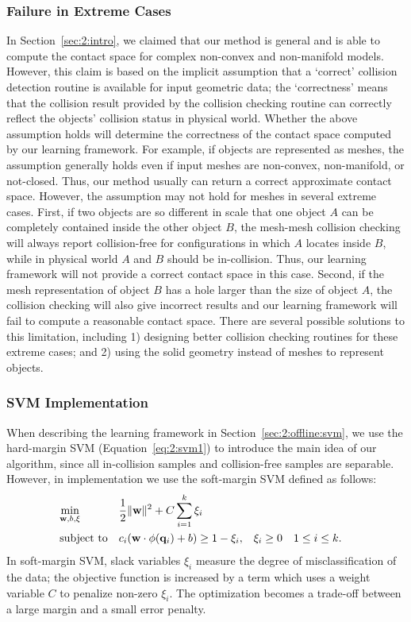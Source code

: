 \subsubsection{Failure in Extreme Cases}
In Section~\ref{sec:2:intro}, we claimed that our method is general and is able to compute the contact space for complex non-convex and non-manifold models. However, this claim is based on the implicit assumption that a `correct' collision detection routine is available for input geometric data; the `correctness' means that the collision result provided by the collision checking routine can correctly reflect the objects' collision status in physical world. Whether the above assumption holds will determine the correctness of the contact space computed by our learning framework. For example, if objects are represented as meshes, the assumption generally holds even if input meshes are non-convex, non-manifold, or not-closed. Thus, our method usually can return a correct approximate contact space. However, the assumption may not hold for meshes in several extreme cases. First, if two objects are so different in scale that one object $A$ can be completely contained inside the other object $B$, the mesh-mesh collision checking will always report collision-free for configurations in which $A$ locates inside $B$, while in physical world $A$ and $B$ should be in-collision. Thus, our learning framework will not provide a correct contact space in this case. Second, if the mesh representation of object $B$ has a hole larger than the size of object $A$, the collision checking will also give incorrect results and our learning framework will fail to compute a reasonable contact space. There are several possible solutions to this limitation, including 1) designing better collision checking routines for these extreme cases; and 2) using the solid geometry instead of meshes to represent objects.

\subsubsection{SVM Implementation}
When describing the learning framework in Section~\ref{sec:2:offline:svm}, we use the hard-margin SVM (Equation~\ref{eq:2:svm1}) to introduce the main idea of our algorithm, since all in-collision samples and collision-free samples are separable. However, in implementation we use the soft-margin SVM defined as follows:
\begin{align}
\label{eq:2:svmsoft}
& \underset{\mathbf w, b, \xi}{\text{min}} & & \frac{1}{2}\|\mathbf w\|^2 + C \sum_{i=1}^k \xi_i & &  \\
& \text{subject to} & & c_i (\mathbf w \cdot \phi(\mathbf q_i) + b)
\geq 1 - \xi_i, & & \xi_i \geq 0 & & 1 \leq i \leq k. \notag
\end{align}
In soft-margin SVM, slack variables $\xi_i$ measure the degree of misclassification of the data; the objective function is increased by a term which uses a weight variable $C$ to penalize non-zero $\xi_i$. The optimization becomes a trade-off between a large margin and a small error penalty. 

